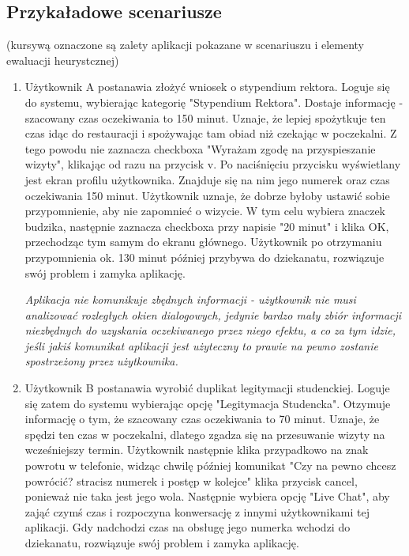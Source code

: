 \documentclass[12pt]{article}
\begin{document}
\subsection{Przykaładowe scenariusze}
(kursywą oznaczone są zalety aplikacji pokazane w scenariuszu i elementy ewaluacji heurystcznej)
\begin {enumerate}
	\item Użytkownik A postanawia złożyć wniosek o stypendium rektora. Loguje się do systemu, wybierając kategorię "Stypendium Rektora". Dostaje informację - szacowany czas oczekiwania to 150 minut. Uznaje, że lepiej spożytkuje ten czas idąc do restauracji i spożywając tam obiad niż czekając w poczekalni. Z tego powodu nie zaznacza checkboxa "Wyrażam zgodę na przyspieszanie wizyty", klikając od razu na przycisk v. Po naciśnięciu przycisku wyświetlany jest ekran profilu użytkownika. Znajduje się na nim jego numerek oraz czas oczekiwania 150 minut. Użytkownik uznaje, że dobrze byłoby ustawić sobie przypomnienie, aby nie zapomnieć o wizycie. W tym celu wybiera znaczek budzika, następnie zaznacza checkboxa przy napisie "20 minut" i klika OK, przechodząc tym samym do ekranu głównego. Użytkownik po otrzymaniu przypomnienia ok. 130 minut później przybywa do dziekanatu, rozwiązuje swój problem i zamyka aplikację.
	
	\textit{Aplikacja nie komunikuje zbędnych informacji - użytkownik nie musi analizować rozległych okien dialogowych, jedynie bardzo mały zbiór informacji niezbędnych do uzyskania oczekiwanego przez niego efektu, a co za tym idzie, jeśli jakiś komunikat aplikacji jest użyteczny to prawie na pewno zostanie spostrzeżony przez użytkownika.}\\
	
	
	\item Użytkownik B postanawia wyrobić duplikat legitymacji studenckiej. Loguje się zatem do systemu wybierając opcję "Legitymacja Studencka". Otzymuje informację o tym, że szacowany czas oczekiwania to 70 minut. Uznaje, że spędzi ten czas w poczekalni, dlatego zgadza się na przesuwanie wizyty na wcześniejszy termin. Użytkownik następnie klika przypadkowo na znak powrotu w telefonie, widząc chwilę później komunikat "Czy na pewno chcesz powrócić? stracisz numerek i postęp w kolejce" klika przycisk cancel, ponieważ nie taka jest jego wola. Następnie wybiera opcję "Live Chat", aby zająć czymś czas i rozpoczyna konwersację z innymi użytkownikami tej aplikacji. Gdy nadchodzi czas na obsługę jego numerka wchodzi do dziekanatu, rozwiązuje swój problem i zamyka aplikację.
	

\end{enumerate}
\end{document}
